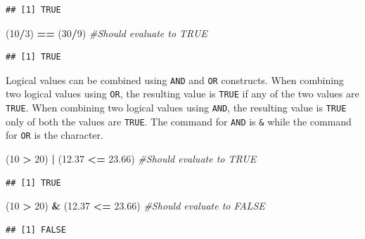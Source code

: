 \documentclass[]{krantz}
\makeatletter
\newenvironment{Shaded}{\begin{snugshade}}{\end{snugshade}}
\newcommand{\DecValTok}[1]{\textcolor[rgb]{0.06,0.06,0.06}{#1}}
\newcommand{\FloatTok}[1]{\textcolor[rgb]{0.06,0.06,0.06}{#1}}
\newcommand{\StringTok}[1]{\textcolor[rgb]{0.5,0.5,0.5}{#1}}
\newcommand{\CommentTok}[1]{\textcolor[rgb]{0.56,0.35,0.01}{\textit{#1}}}
\newcommand{\OperatorTok}[1]{\textcolor[rgb]{0.81,0.36,0.00}{\textbf{#1}}}
\newcommand{\NormalTok}[1]{#1}
\newenvironment{kframe}{%
\medskip{}
\setlength{\fboxsep}{.8em}
 \def\at@end@of@kframe{}%
 \ifinner\ifhmode%
  \def\at@end@of@kframe{\end{minipage}}%
  \begin{minipage}{\columnwidth}%
 \fi\fi%
 \def\FrameCommand##1{\hskip\@totalleftmargin \hskip-\fboxsep
 \colorbox{shadecolor}{##1}\hskip-\fboxsep
     \hskip-\linewidth \hskip-\@totalleftmargin \hskip\columnwidth}%
 \MakeFramed {\advance\hsize-\width
   \@totalleftmargin\z@ \linewidth\hsize
   \@setminipage}}%
 {\par\unskip\endMakeFramed%
 \at@end@of@kframe}
\renewenvironment{Shaded}{\begin{kframe}}{\end{kframe}}
\theoremstyle{definition}
\theoremstyle{definition}
\theoremstyle{definition}
\theoremstyle{remark}
\makeatother
\begin{document}
\begin{verbatim}
## [1] TRUE
\end{verbatim}

\begin{Shaded}
\begin{Highlighting}[]
\NormalTok{(}\DecValTok{10}\OperatorTok{/}\DecValTok{3}\NormalTok{) }\OperatorTok{==}\StringTok{ }\NormalTok{(}\DecValTok{30}\OperatorTok{/}\DecValTok{9}\NormalTok{) }\CommentTok{#Should evaluate to TRUE}
\end{Highlighting}
\end{Shaded}

\begin{verbatim}
## [1] TRUE
\end{verbatim}

Logical values can be combined using \texttt{AND} and \texttt{OR}
constructs. When combining two logical values using \texttt{OR}, the
resulting value is \texttt{TRUE} if any of the two values are
\texttt{TRUE}. When combining two logical values using \texttt{AND}, the
resulting value is \texttt{TRUE} only of both the values are
\texttt{TRUE}. The command for \texttt{AND} is \texttt{\&} while the
command for \texttt{OR} is the \texttt{\textbar{}} character.

\begin{Shaded}
\begin{Highlighting}[]
\NormalTok{(}\DecValTok{10} \OperatorTok{>}\StringTok{ }\DecValTok{20}\NormalTok{) }\OperatorTok{|}\StringTok{ }\NormalTok{(}\FloatTok{12.37} \OperatorTok{<=}\StringTok{ }\FloatTok{23.66}\NormalTok{) }\CommentTok{#Should evaluate to TRUE}
\end{Highlighting}
\end{Shaded}

\begin{verbatim}
## [1] TRUE
\end{verbatim}

\begin{Shaded}
\begin{Highlighting}[]
\NormalTok{(}\DecValTok{10} \OperatorTok{>}\StringTok{ }\DecValTok{20}\NormalTok{) }\OperatorTok{&}\StringTok{ }\NormalTok{(}\FloatTok{12.37} \OperatorTok{<=}\StringTok{ }\FloatTok{23.66}\NormalTok{) }\CommentTok{#Should evaluate to FALSE}
\end{Highlighting}
\end{Shaded}

\begin{verbatim}
## [1] FALSE
\end{verbatim}
\end{document}
